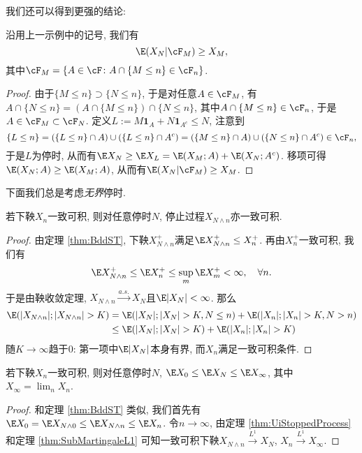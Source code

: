 \documentclass[a4paper, 10pt]{ctexart}
\begin{document}
\noindent
我们还可以得到更强的结论: 
\begin{example}[Doob有界停时定理]
	沿用上一示例中的记号, 我们有
	\begin{equation*}
		\E(X_N|\cF_M) \geq X_M, 
	\end{equation*}
	其中$\cF_M = \{A \in \cF \colon A \cap \{M \leq n\} \in \cF_n \}$. 
\end{example}
\begin{proof}
	由于$\{M \leq n\} \supset \{N \leq n\}$, 于是对任意$A \in \cF_M$, 有$A \cap \{N \leq n\} = \left( A \cap \{M \leq n\} \right) \cap  \{N \leq n\}$, 其中$A \cap \{M \leq n\} \in \cF_n$, 于是$A \in \cF_M \subset \cF_N$. 
	定义$L:=M \mathbf{1}_A + N \mathbf{1}_{A^c} \leq N$, 注意到
	\begin{equation*}
		\{L \leq n\} 
		= (\{L \leq n\} \cap A) \cup (\{L \leq n\} \cap A^c)
		= (\{M \leq n\} \cap A) \cup (\{N \leq n\} \cap A^c) 
		\in \cF_n, 
	\end{equation*}
	于是$L$为停时, 从而有$\E X_N \geq \E X_L = \E(X_M;A) + \E(X_N;A^c)$. 
	移项可得$\E(X_N;A) \geq \E(X_M;A)$, 从而有$\E(X_N|\cF_M) \geq X_M$. 
\end{proof}

下面我们总是考虑\emph{无界}停时. 

\begin{theorem}\label{thm:UiStoppedProcess}
	若下鞅$X_n$一致可积, 则对任意停时$N$, 停止过程$X_{N \wedge n}$亦一致可积. 
\end{theorem}
\begin{proof}
	由定理 \ref{thm:BddST}, 下鞅$X_{N \wedge n}^+$满足$\E X_{N \wedge n}^+ \leq X_{n}^+$. 
	再由$X_n^+$一致可积, 我们有
	\begin{equation*}
		\E X_{N \wedge n}^+ \leq \E X_n^+ \leq \sup_m \E X_m^+ < \infty, \quad \forall n. 
	\end{equation*}
	于是由鞅收敛定理, $X_{N \wedge n} \stackrel{a.s.}{\to} X_N$且$\E |X_N| < \infty$. 
	那么
	\begin{align*}
		\E(|X_{N \wedge n}|; |X_{N \wedge n}| > K)
		&= \E(|X_N|; |X_N| > K, N \leq n) + \E(|X_n|; |X_n| > K, N > n) \\
		&\leq \E(|X_N|; |X_N| > K) + \E(|X_n|; |X_n| > K) 
	\end{align*}
	随$K \to \infty$趋于$0$: 第一项中$\E|X_N|$本身有界, 而$X_n$满足一致可积条件. 
\end{proof}

\begin{theorem}
	若下鞅$X_n$一致可积, 则对任意停时$N$, $\E X_0 \leq \E X_N \leq \E X_\infty$, 其中$X_\infty = \lim_n X_n$. 
\end{theorem}
\begin{proof}
	和定理 \ref{thm:BddST} 类似, 我们首先有$\E X_0 = \E X_{N \wedge 0} \leq \E X_{N \wedge n} \leq \E X_n$. 
	令$n \to \infty$, 由定理 \ref{thm:UiStoppedProcess} 和定理 \ref{thm:SubMartingaleL1} 可知一致可积下鞅$X_{N \wedge n} \stackrel{L^1}{\to} X_N$, $X_{n} \stackrel{L^1}{\to} X_{\infty}$. 
\end{proof}
\end{document}
